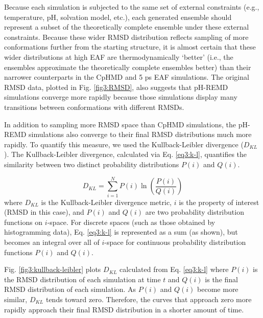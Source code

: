 Because each simulation is subjected to the same set of external constraints
(e.g., temperature, pH, solvation model, etc.), each generated ensemble should
represent a subset of the theoretically complete ensemble under these external
constraints.  Because these wider RMSD distribution reflects sampling of more
conformations further from the starting structure, it is almost certain that
these wider distributions at high EAF are thermodynamically `better' (i.e., the
ensembles approximate the theoretically complete ensembles better) than their
narrower counterparts in the CpHMD and 5 ps EAF simulations.  The
original RMSD data, plotted in Fig. \ref{fig3:RMSD}, also suggests that pH-REMD
simulations converge more rapidly because those simulations display many
transitions between conformations with different RMSDs.

In addition to sampling more RMSD space than CpHMD simulations, the pH-REMD
simulations also converge to their final RMSD distributions much more rapidly.
To quantify this measure, we used the Kullback-Leibler divergence
\cite{Hamacher2007,McClendon2012} ($D_{KL}$).  The Kullback-Leibler divergence,
calculated via Eq. \ref{eq3:k-l}, quantifies the similarity between two distinct
probability distributions $P(i)$ and $Q(i)$.

\begin{equation}
 D_{KL} = \sum _ {i=1} ^ N P(i) \ln \left( \frac{P(i)} {Q(i)} \right)
 \label{eq3:k-l}
\end{equation}
where $D_{KL}$ is the Kullback-Leibler divergence metric, $i$ is the property of
interest (RMSD in this case), and $P(i)$ and $Q(i)$ are two probability
distribution functions on $i$-space.  For discrete spaces (such as those
obtained by histogramming data), Eq. \ref{eq3:k-l} is represented as a sum (as
shown), but becomes an integral over all of $i$-space for continuous probability
distribution functions $P(i)$ and $Q(i)$.

Fig. \ref{fig3:kullback-leibler} plots $D_{KL}$ calculated from Eq.
\ref{eq3:k-l} where $P(i)$ is the RMSD distribution of each simulation at time
$t$ and $Q(i)$ is the final RMSD distribution of each simulation.  As $P(i)$ and
$Q(i)$ become more similar, $D_{KL}$ tends toward zero.  Therefore, the curves
that approach zero more rapidly approach their final RMSD distribution in a
shorter amount of time.

